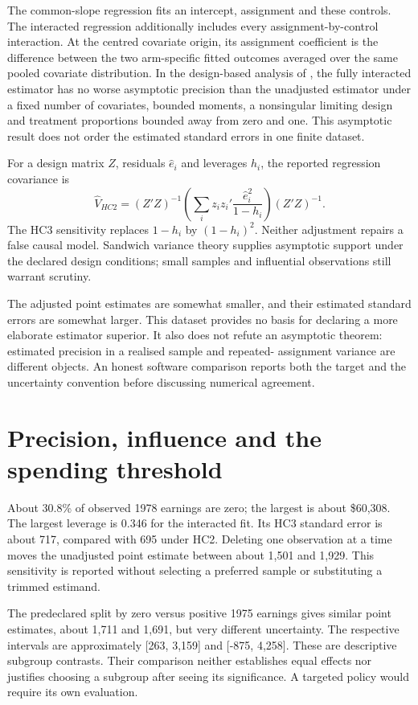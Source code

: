 The common-slope regression fits an intercept, assignment and these controls.
The interacted regression additionally includes every assignment-by-control
interaction. At the centred covariate origin, its assignment coefficient is
the difference between the two arm-specific fitted outcomes averaged over
the same pooled covariate distribution. In the design-based analysis of
\citet{gap29lin}, the fully interacted estimator has no worse asymptotic
precision than the unadjusted estimator under a fixed number of covariates,
bounded moments, a nonsingular limiting design and treatment proportions
bounded away from zero and one. This asymptotic result does not order the
estimated standard errors in one finite dataset.

For a design matrix $Z$, residuals $\widehat e_i$ and leverages $h_i$, the
reported regression covariance is
\[
 \widehat V_{HC2}=(Z'Z)^{-1}
 \left(\sum_i z_i z_i'\frac{\widehat e_i^2}{1-h_i}\right)(Z'Z)^{-1}.
\]
The HC3 sensitivity replaces $1-h_i$ by $(1-h_i)^2$. Neither adjustment
repairs a false causal model. Sandwich variance theory supplies asymptotic
support under the declared design conditions; small samples and influential
observations still warrant scrutiny. \citep{gap29lin}



The adjusted point estimates are somewhat smaller, and their estimated
standard errors are somewhat larger. This dataset provides no basis for
declaring a more elaborate estimator superior. It also does not refute an
asymptotic theorem: estimated precision in a realised sample and repeated-
assignment variance are different objects. An honest software comparison
reports both the target and the uncertainty convention before discussing
numerical agreement.

\section{Precision, influence and the spending threshold}
About 30.8\% of observed 1978 earnings are zero; the largest is about
\$60,308. The largest leverage is 0.346 for the interacted fit. Its HC3
standard error is about 717, compared with 695 under HC2. Deleting one
observation at a time moves the unadjusted point estimate between about
1,501 and 1,929. This sensitivity is reported without selecting a preferred
sample or substituting a trimmed estimand.

The predeclared split by zero versus positive 1975 earnings gives similar
point estimates, about 1,711 and 1,691, but very different uncertainty. The
respective intervals are approximately [263, 3,159] and [-875, 4,258].
These are descriptive subgroup contrasts. Their comparison neither
establishes equal effects nor justifies choosing a subgroup after seeing
its significance. A targeted policy would require its own evaluation.

